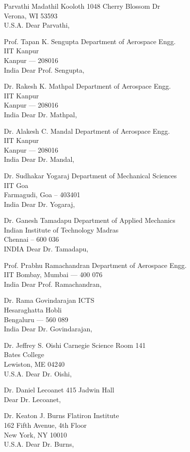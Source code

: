 Parvathi Madathil Kooloth
1048 Cherry Blossom Dr\\Verona, WI 53593\\U.S.A.
Dear Parvathi,

Prof. Tapan K. Sengupta
Department of Aerospace Engg.\\IIT Kanpur\\Kanpur --- 208016\\India
Dear Prof. Sengupta,

Dr. Rakesh K. Mathpal
Department of Aerospace Engg.\\IIT Kanpur\\Kanpur --- 208016\\India
Dear Dr. Mathpal,

Dr. Alakesh C. Mandal
Department of Aerospace Engg.\\IIT Kanpur\\Kanpur --- 208016\\India
Dear Dr. Mandal,

Dr. Sudhakar Yogaraj
Department of Mechanical Sciences\\IIT Goa\\Farmagudi, Goa -- 403401\\India
Dear Dr. Yogaraj,

Dr. Ganesh Tamadapu
Department of Applied Mechanics\\Indian Institute of Technology Madras\\Chennai -- 600 036\\INDIA
Dear Dr. Tamadapu,

Prof. Prabhu Ramachandran
Department of Aerospace Engg.\\IIT Bombay, Mumbai --- 400 076\\India
Dear Prof. Ramachandran,

Dr. Rama Govindarajan
ICTS\\Hesaraghatta Hobli\\Bengaluru --- 560 089\\India
Dear Dr. Govindarajan,

Dr. Jeffrey S. Oishi
Carnegie Science Room 141\\Bates College\\Lewiston, ME 04240\\U.S.A.
Dear Dr. Oishi,

Dr. Daniel Lecoanet
415 Jadwin Hall\\
Dear Dr. Lecoanet,

Dr. Keaton J. Burns
Flatiron Institute\\162 Fifth Avenue, 4th Floor\\New York, NY 10010\\U.S.A.
Dear Dr. Burns,

